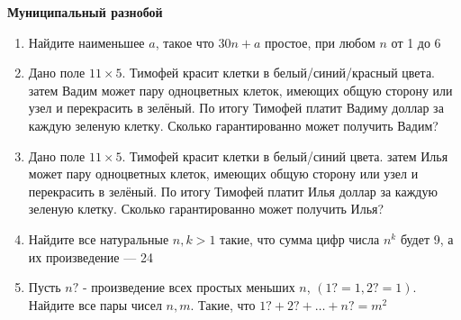 \documentclass{article}
\begin{document}
\large
	

\begin{center}
\textbf{Муниципальный разнобой}
\end{center}

\begin{enumerate}[label*=\protect\fbox{\arabic{enumi}}]
	
\item Найдите наименьшее $a$, такое что $30n + a$ простое, при любом $n$ от 1 до 6

\item Дано поле $11 \times 5$. Тимофей красит клетки в белый/синий/красный цвета. затем Вадим может пару одноцветных клеток, имеющих общую сторону или узел и перекрасить в зелёный. По итогу Тимофей платит Вадиму доллар за каждую зеленую клетку. Сколько гарантированно может получить Вадим?

\item Дано поле $11 \times 5$. Тимофей красит клетки в белый/синий цвета. затем Илья может пару одноцветных клеток, имеющих общую сторону или узел и перекрасить в зелёный. По итогу Тимофей платит Илья доллар за каждую зеленую клетку. Сколько гарантированно может получить Илья?

\item Найдите все натуральные $n, k > 1$ такие, что сумма цифр числа $n^k$ будет 9, а их произведение --- 24

\item Пусть $n?$ - произведение всех простых меньших $n$, $(1? = 1, 2? = 1)$. Найдите все пары чисел $n, m$. Такие, что $1? + 2? + … + n? = m^2$




\end{enumerate}
\end{document}
